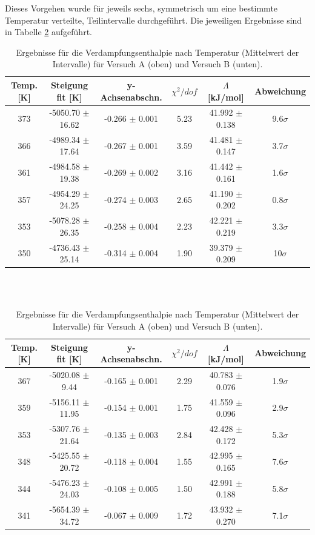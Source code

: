 \documentclass[12pt,a4paper]{article}
\begin{document}
Dieses Vorgehen wurde für jeweils sechs, symmetrisch um eine bestimmte Temperatur verteilte, Teilintervalle durchgeführt. Die jeweiligen Ergebnisse sind in Tabelle \ref{tab:enthalpie_A}
aufgeführt.\\


\begin{table}[H]
	\begin{tabular}{|c|c|c|c|c|c|}
		\hline
		\textbf{Temp. [K]} & \textbf{Steigung fit [K]} & \textbf{y-Achsenabschn.} & $\chi ^2/dof$ & \textbf{$\Lambda$ [kJ/mol]} & \textbf{Abweichung} \\
		\hline
		373 & -5050.70 $\pm$ 16.62 & -0.266 $\pm$ 0.001 & 5.23 & 41.992 $\pm$ 0.138 & 9.6$\sigma$ \\
		\hline
		366 & -4989.34 $\pm$ 17.64 & -0.267 $\pm$ 0.001 & 3.59 & 41.481 $\pm$ 0.147 & 3.7$\sigma$ \\
		\hline
		361 & -4984.58 $\pm$ 19.38 & -0.269 $\pm$ 0.002 & 3.16 & 41.442 $\pm$ 0.161 & 1.6$\sigma$ \\
		\hline
		357 & -4954.29 $\pm$ 24.25 & -0.274 $\pm$ 0.003 & 2.65 & 41.190 $\pm$ 0.202 & 0.8$\sigma$ \\
		\hline
		353 & -5078.28 $\pm$ 26.35 & -0.258 $\pm$ 0.004 & 2.23 & 42.221 $\pm$ 0.219 & 3.3$\sigma$ \\
		\hline
		350 & -4736.43 $\pm$ 25.14 & -0.314 $\pm$ 0.004 & 1.90 & 39.379 $\pm$ 0.209 & 10$\sigma$ \\
		\hline 
	\end{tabular}\\		
\\

	\begin{tabular}{|c|c|c|c|c|c|}
		\hline
		\textbf{Temp. [K]} & \textbf{Steigung fit [K]} & \textbf{y-Achsenabschn.} & $\chi ^2/dof$ & \textbf{$\Lambda$ [kJ/mol]} & \textbf{Abweichung} \\
		\hline
		367 & -5020.08 $\pm$ 9.44 & -0.165 $\pm$ 0.001 & 2.29 & 40.783 $\pm$ 0.076 & 1.9$\sigma$ \\
		\hline
		359 & -5156.11 $\pm$ 11.95 & -0.154 $\pm$ 0.001 & 1.75 & 41.559 $\pm$ 0.096 & 2.9$\sigma$ \\
		\hline
		353 & -5307.76 $\pm$ 21.64 & -0.135 $\pm$ 0.003 & 2.84 & 42.428 $\pm$ 0.172 & 5.3$\sigma$ \\
		\hline
		348 & -5425.55 $\pm$ 20.72 & -0.118 $\pm$ 0.004 & 1.55 & 42.995 $\pm$ 0.165 & 7.6$\sigma$ \\
		\hline
		344 & -5476.23 $\pm$ 24.03 & -0.108 $\pm$ 0.005 & 1.50 & 42.991 $\pm$ 0.188 & 5.8$\sigma$ \\
		\hline
		341 & -5654.39 $\pm$ 34.72 & -0.067 $\pm$ 0.009 & 1.72 & 43.932 $\pm$ 0.270 & 7.1$\sigma$ \\
		\hline
	\end{tabular}



	\caption{Ergebnisse für die Verdampfungsenthalpie nach Temperatur (Mittelwert der Intervalle) für Versuch A (oben) und Versuch B (unten).}
	\label{tab:enthalpie_A}
\end{table}
\end{document}
